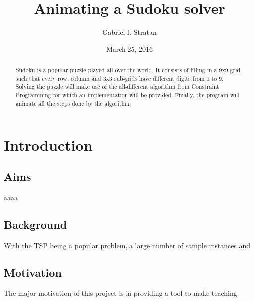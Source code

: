 \documentclass{l4proj}
\begin{document}
\title{Animating a Sudoku solver}
\author{Gabriel I. Stratan}
\date{March 25, 2016}
\maketitle

\begin{abstract}
Sudoku is a popular puzzle played all over the world. It consists of filling in a 9x9 grid such that every row, column and 3x3 sub-grids have different digits from 1 to 9. Solving the puzzle will make use of the all-different algorithm from Constraint Programming for which an implementation will be provided. Finally, the program will animate all the steps done by the algorithm.
\end{abstract}

\educationalconsent
%
%
\tableofcontents
\chapter{Introduction}
\label{chap1intro}

\section{Aims}
aaaa

\section{Background}
With the TSP being a popular problem, a large number of sample instances and 

\section{Motivation}
The major motivation of this project is in providing a tool to make teaching 
\end{document}
